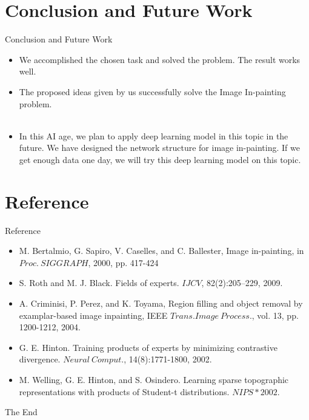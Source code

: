 \documentclass{beamer}
\begin{document}
\section{Conclusion and Future Work}
\begin{frame}{Conclusion and Future Work}
	\begin{itemize}[<+->]
		\item We accomplished the chosen task and solved the problem. The result works well.
		\item The proposed ideas given by us successfully solve the Image In-painting problem.\\\ \\ 
		\item In this AI age, we plan to apply deep learning model in this topic in the future. We have designed the network structure for image in-painting. If we get enough data one day, we will try this deep learning model on this topic.
	\end{itemize}
\end{frame}
%
\section*{Reference}
\begin{frame}{Reference}
	\begin{itemize}
		\item M. Bertalmio, G. Sapiro, V. Caselles, and C. Ballester, Image in-painting, in $Proc.\ SIGGRAPH$, 2000, pp. 417-424
		\item S. Roth and M. J. Black. Fields of experts. $IJCV$, 82(2):205–229,
		2009.
		\item A. Criminisi, P. Perez, and K. Toyama, Region filling and object
		removal by examplar-based image inpainting, IEEE $Trans. Image\ 
		Process.$, vol. 13, pp. 1200-1212, 2004.
		\item G. E. Hinton. Training products of experts by minimizing contrastive
		divergence. $Neural\ Comput.$, 14(8):1771-1800, 2002.
		\item M. Welling, G. E. Hinton, and S. Osindero. Learning sparse topographic representations with products of Student-t distributions.
		$NIPS*2002$.
	\end{itemize}
\end{frame}

\begin{frame}
\centering
\Huge{{The End}}
\end{frame}
\end{document}
